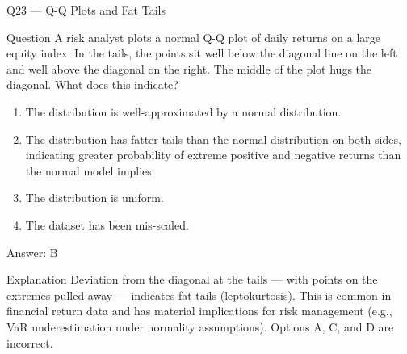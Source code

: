 \documentclass[aspectratio=169,8pt]{beamer}
\begin{document}
	\begin{frame}{Q23 --- Q-Q Plots and Fat Tails}
		\begin{block}{Question}
			A risk analyst plots a normal Q-Q plot of daily returns on a large equity index. In the tails, the points sit well below the diagonal line on the left and well above the diagonal on the right. The middle of the plot hugs the diagonal. What does this indicate?
		\end{block}
		\begin{enumerate}
			\item The distribution is well-approximated by a normal distribution.
			\item The distribution has fatter tails than the normal distribution on both sides, indicating greater probability of extreme positive and negative returns than the normal model implies.
			\item The distribution is uniform.
			\item The dataset has been mis-scaled.
		\end{enumerate}
		\begin{exampleblock}{Answer: B}\end{exampleblock}
		\begin{block}{Explanation}
			Deviation from the diagonal at the tails --- with points on the extremes pulled away --- indicates fat tails (leptokurtosis). This is common in financial return data and has material implications for risk management (e.g., VaR underestimation under normality assumptions). Options A, C, and D are incorrect.
		\end{block}
	\end{frame}
	
\end{document}
